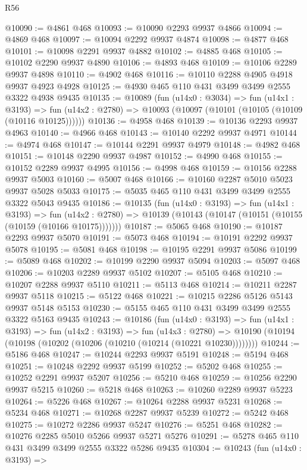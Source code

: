 \begin{lexlean}{R56}
\begin{coremodule}
@10090 := @4861 @468
@10093 := @10090 @2293 @9937 @4866
@10094 := @4869 @468
@10097 := @10094 @2292 @9937 @4874
@10098 := @4877 @468
@10101 := @10098 @2291 @9937 @4882
@10102 := @4885 @468
@10105 := @10102 @2290 @9937 @4890
@10106 := @4893 @468
@10109 := @10106 @2289 @9937 @4898
@10110 := @4902 @468
@10116 := @10110 @2288 @4905 @4918 @9937 @4923 @4928
@10125 := @4930 @465 @110 @431 @3499 @3499 @2555 @3322 @4938 @9435
@10135 := @10089
    (fun (u14x0 : @3034) =>
    fun (u14x1 : @3193) =>
    fun (u14x2 : @2780) => @10093 (@10097 (@10101 (@10105 (@10109 (@10116 @10125))))))
@10136 := @4958 @468
@10139 := @10136 @2293 @9937 @4963
@10140 := @4966 @468
@10143 := @10140 @2292 @9937 @4971
@10144 := @4974 @468
@10147 := @10144 @2291 @9937 @4979
@10148 := @4982 @468
@10151 := @10148 @2290 @9937 @4987
@10152 := @4990 @468
@10155 := @10152 @2289 @9937 @4995
@10156 := @4998 @468
@10159 := @10156 @2288 @9937 @5003
@10160 := @5007 @468
@10166 := @10160 @2287 @5010 @5023 @9937 @5028 @5033
@10175 := @5035 @465 @110 @431 @3499 @3499 @2555 @3322 @5043 @9435
@10186 := @10135
    (fun (u14x0 : @3193) =>
    fun (u14x1 : @3193) =>
    fun (u14x2 : @2780) => @10139 (@10143 (@10147 (@10151 (@10155 (@10159 (@10166 @10175)))))))
@10187 := @5065 @468
@10190 := @10187 @2293 @9937 @5070
@10191 := @5073 @468
@10194 := @10191 @2292 @9937 @5078
@10195 := @5081 @468
@10198 := @10195 @2291 @9937 @5086
@10199 := @5089 @468
@10202 := @10199 @2290 @9937 @5094
@10203 := @5097 @468
@10206 := @10203 @2289 @9937 @5102
@10207 := @5105 @468
@10210 := @10207 @2288 @9937 @5110
@10211 := @5113 @468
@10214 := @10211 @2287 @9937 @5118
@10215 := @5122 @468
@10221 := @10215 @2286 @5126 @5143 @9937 @5148 @5153
@10230 := @5155 @465 @110 @431 @3499 @3499 @2555 @3322 @5163 @9435
@10243 := @10186
    (fun (u14x0 : @3193) =>
    fun (u14x1 : @3193) =>
    fun (u14x2 : @3193) =>
    fun (u14x3 : @2780) =>
    @10190 (@10194 (@10198 (@10202 (@10206 (@10210 (@10214 (@10221 @10230))))))))
@10244 := @5186 @468
@10247 := @10244 @2293 @9937 @5191
@10248 := @5194 @468
@10251 := @10248 @2292 @9937 @5199
@10252 := @5202 @468
@10255 := @10252 @2291 @9937 @5207
@10256 := @5210 @468
@10259 := @10256 @2290 @9937 @5215
@10260 := @5218 @468
@10263 := @10260 @2289 @9937 @5223
@10264 := @5226 @468
@10267 := @10264 @2288 @9937 @5231
@10268 := @5234 @468
@10271 := @10268 @2287 @9937 @5239
@10272 := @5242 @468
@10275 := @10272 @2286 @9937 @5247
@10276 := @5251 @468
@10282 := @10276 @2285 @5010 @5266 @9937 @5271 @5276
@10291 := @5278 @465 @110 @431 @3499 @3499 @2555 @3322 @5286 @9435
@10304 := @10243
    (fun (u14x0 : @3193) =>

\end{coremodule}
\end{lexlean}
